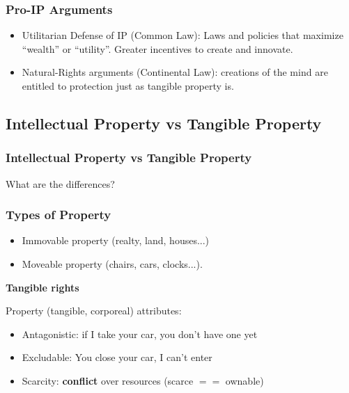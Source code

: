 \documentclass{beamer}
\begin{document}

\begin{frame}
\frametitle{Pro-IP Arguments}

\begin{itemize}
\item \alert{Utilitarian Defense of IP} (Common Law): Laws and policies that maximize  ``wealth'' or ``utility''. Greater incentives to create and innovate.
\item \alert{Natural-Rights arguments} (Continental Law): creations of the mind are entitled to protection just as tangible property is. 
\end{itemize}

\end{frame}

\subsection{Intellectual Property vs Tangible Property}
\begin{frame}
\frametitle{Intellectual Property vs Tangible Property}

\begin{center}
\Large
What are the differences?
\end{center}

\end{frame}



\begin{frame}
\frametitle{Types of Property}


\begin{itemize}
\item \alert{Immovable property} (realty, land, houses...) 
\item \alert{Moveable property} (chairs, cars, clocks...).
\end{itemize}
\pause
\begin{center}
\alert{\textbf{Tangible rights}}
\end{center}
\pause
\medskip

Property (tangible, corporeal) attributes:
\pause
\begin {itemize}
\item \alert{Antagonistic}: if I take your car, you don't have one yet
\pause
\item \alert{Excludable}: You close your car, I can't enter
\pause
\item \alert{Scarcity}: \textbf{conflict} over resources (scarce $==$ ownable)
\end{itemize}

\end{frame}
\end{document}
